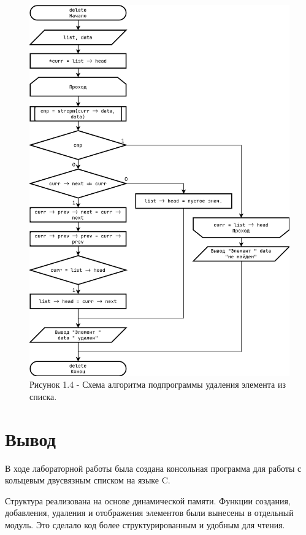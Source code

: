 \documentclass[oneside,a4paper,14pt]{extarticle}
\begin{document}
\clearpage
\begin{figure}[H]
	\centering
	\includegraphics[height=0.9\textheight]{pics/flowchart4.png}
	\caption*{Рисунок 1.4 - Схема алгоритма подпрограммы удаления элемента из списка.}
\end{figure}

\section*{Вывод}


В ходе лабораторной работы была создана консольная программа для работы с кольцевым двусвязным списком на языке C. 

Структура реализована на основе динамической памяти. Функции создания, добавления, удаления и отображения элементов были вынесены в отдельный модуль. Это сделало код более структурированным и удобным для чтения. 
\end{document}
